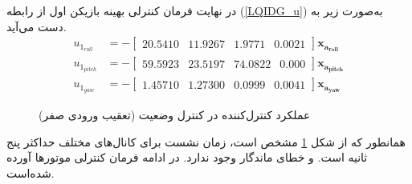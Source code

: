 \documentclass{CCI2020}
\begin{document}
		در نهایت فرمان کنترلی بهینه بازیکن اول از رابطه
		(\ref{LQIDG_u})
		به‌صورت زیر به دست می‌آید.
		\begin{equation}
			\begin{split}
				u_{1_{roll}} &= -\begin{bmatrix}
					20.5410 & 11.9267 & 1.9771 & 0.0021
				\end{bmatrix} \boldsymbol{x_{a_{roll}}} \\
				u_{1_{pitch}} &= -\begin{bmatrix}
					59.5923 & 23.5197 & 74.0822 & 0.000
				\end{bmatrix} \boldsymbol{x_{a_{pitch}}} \\
				u_{1_{yaw}} &= -\begin{bmatrix}
					1.45710 & 1.27300 & 0.0999 & 0.0041
				\end{bmatrix} \boldsymbol{x_{a_{yaw}}} 
			\end{split}
		\end{equation}
		\begin{figure}[H]
			\centering
			\caption{عملکرد کنترل‌کننده  در کنترل وضعیت (تعقیب ورودی صفر)}
			\label{lqidg_roll_pitch_yaw_fig_simulation_ll}
		\end{figure}
	 همانطور که از شکل
		\ref{lqidg_roll_pitch_yaw_fig_simulation_ll}
		مشخص است، زمان نشست برای کانال‌های مختلف حداکثر پنج ثانیه است. و خطای ماندگار وجود ندارد. در ادامه فرمان کنترلی موتورها آورده شده‌است.
		
\end{document}
